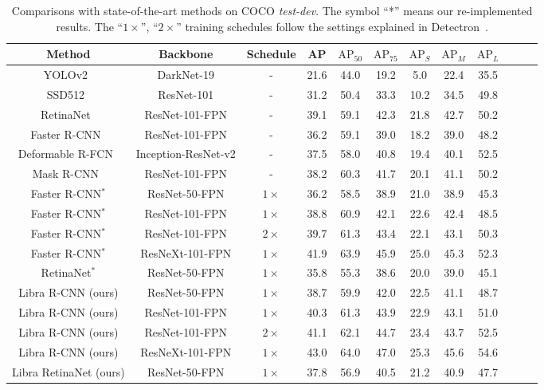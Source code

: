 \documentclass[10pt,twocolumn,letterpaper]{article}
\begin{document}
\begin{table*}[htb]
	\centering
	\caption{Comparisons with state-of-the-art methods on COCO \emph{test-dev}.
	  The symbol ``*'' means our re-implemented results.
	  The ``$1\times$'', ``$2\times$'' training schedules follow the settings explained in Detectron~\cite{Detectron2018}.}
	\vspace{-5pt}
	\addtolength{\tabcolsep}{1pt}
	\begin{tabular}{*{12}{c}}
		\toprule
		Method                       & Backbone  & Schedule   &  AP & $\text{AP}_{50}$ & $\text{AP}_{75}$ & $\text{AP}_{S}$ & $\text{AP}_{M}$ & $\text{AP}_{L}$  \\
		\midrule
		YOLOv2~\cite{yolo9000} & DarkNet-19 & - & 21.6 & 44.0 & 19.2 & 5.0 & 22.4 & 35.5\\
		SSD512~\cite{ssd} & ResNet-101 & - & 31.2 & 50.4 & 33.3 & 10.2 & 34.5 & 49.8 \\
		RetinaNet~\cite{focalloss} & ResNet-101-FPN & -  & 39.1 & 59.1 & 42.3 & 21.8 & 42.7 & 50.2 \\
		Faster R-CNN~\cite{fpn} & ResNet-101-FPN & - & 36.2 & 59.1 & 39.0 & 18.2 & 39.0 & 48.2 \\
		Deformable R-FCN~\cite{rfcn} & Inception-ResNet-v2 & -  & 37.5 & 58.0 & 40.8 & 19.4 & 40.1 & 52.5 \\
		Mask R-CNN~\cite{maskrcnn} & ResNet-101-FPN & - & 38.2 & 60.3 & 41.7 & 20.1 & 41.1 & 50.2 \\
		\midrule
		Faster R-CNN$^*$ & ResNet-50-FPN & $1\times$ & 36.2 & 58.5 & 38.9 & 21.0 & 38.9 & 45.3            \\
		Faster R-CNN$^*$ & ResNet-101-FPN & $1\times$ & 38.8 & 60.9 & 42.1 & 22.6 & 42.4 & 48.5         \\
		Faster R-CNN$^*$ & ResNet-101-FPN & $2\times$ & 39.7 & 61.3 & 43.4 & 22.1 & 43.1 & 50.3           \\
		Faster R-CNN$^*$ & ResNeXt-101-FPN & $1\times$ & 41.9 & 63.9 & 45.9 & 25.0 & 45.3 & 52.3 \\
		RetinaNet$^*$ & ResNet-50-FPN & $1\times$ & 35.8 & 55.3 & 38.6 & 20.0 & 39.0 & 45.1  \\
		\midrule
		Libra R-CNN (ours) & ResNet-50-FPN & $1\times$ & 38.7 & 59.9 & 42.0 & 22.5 & 41.1 & 48.7 \\
		Libra R-CNN (ours) & ResNet-101-FPN & $1\times$ & 40.3 & 61.3 & 43.9 & 22.9 & 43.1 & 51.0 \\
		Libra R-CNN (ours) & ResNet-101-FPN & $2\times$ & 41.1 & 62.1 & 44.7 & 23.4 & 43.7 & 52.5 \\
		Libra R-CNN (ours) & ResNeXt-101-FPN  & $1\times$ & 43.0 & 64.0 & 47.0 & 25.3 & 45.6 & 54.6 \\
		Libra RetinaNet (ours) & ResNet-50-FPN & $1\times$ & 37.8 & 56.9 & 40.5 & 21.2 & 40.9 & 47.7  \\
		\bottomrule
	\end{tabular}
	\vspace{-5pt}
	\label{tab:overall-results}
\end{table*}
\end{document}
